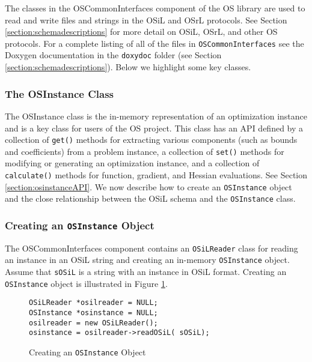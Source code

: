\documentclass[11pt]{article}
\newcounter{Fig}
\renewcommand{\_}{{\char"5F}}
\renewcommand{\{}{{\char"7B}}
\renewcommand{\}}{{\char"7D}}
\renewcommand{\^}{{\char"0D}}
\renewcommand{\'}{{\char"0D}}
\begin{document}
The classes in the OSCommonInterfaces component of the OS library are  used  to read and write files and strings in the OSiL and OSrL protocols. See Section \ref{section:schemadescriptions} for more detail on OSiL, OSrL, and other OS protocols. For a complete listing of all of the files in {\tt OSCommonInterfaces} see the Doxygen documentation in the {\tt doxydoc} folder (see Section \ref{section:schemadescriptions}).  Below we highlight some key classes.





\subsubsection{The OSInstance Class}\label{section:osinstanceclass}

The OSInstance class is the in-memory representation of an optimization instance and is a key class for users of the OS project. This class has an API defined by a collection of {\tt get()} methods for extracting various components (such as bounds and coefficients) from a problem instance, a collection of {\tt set()} methods for modifying or generating an optimization instance, and a collection of {\tt calculate()} methods for function, gradient, and Hessian evaluations.  See Section \ref{section:osinstanceAPI}.  We now describe how to create an {\tt OSInstance} object and the close relationship between the OSiL schema and the {\tt OSInstance} class. 

\subsubsection{Creating an {\tt OSInstance} Object}

The OSCommonInterfaces component contains an {\tt OSiLReader}  class for reading an instance in an OSiL string and creating an in-memory {\tt OSInstance} object.  Assume that {\tt sOSiL} is a string with an instance in OSiL format. Creating an {\tt OSInstance} object is illustrated in Figure \ref{figure:creatingosinstanceobject}.

\begin{figure}[ht]
\centering
\begin{verbatim}
OSiLReader *osilreader = NULL;
OSInstance *osinstance = NULL;
osilreader = new OSiLReader(); 
osinstance = osilreader->readOSiL( sOSiL);
\end{verbatim}
\caption{Creating an {\tt OSInstance} Object} \label{figure:creatingosinstanceobject}
\end{figure}
\end{document}
